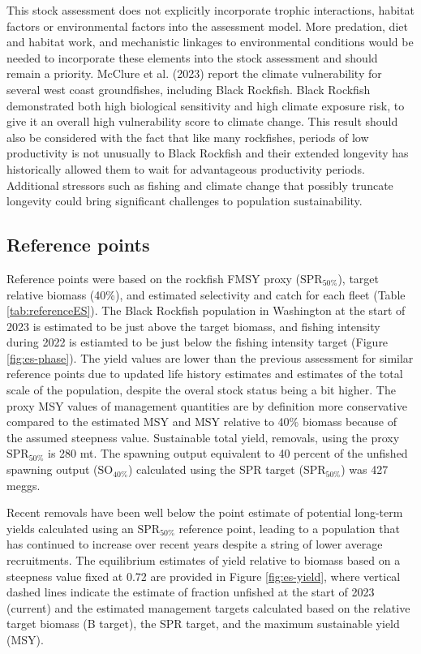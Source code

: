 \documentclass[11pt,
  english,
  letterpaper,
]{article}
\begin{document}
This stock assessment does not explicitly incorporate trophic interactions, habitat factors or environmental factors into the assessment model. More predation, diet and habitat work, and mechanistic linkages to environmental conditions would be needed to incorporate these elements into the stock assessment and should remain a priority. McClure et al. (2023) report the climate vulnerability for several west coast groundfishes, including Black Rockfish. Black Rockfish demonstrated both high biological sensitivity and high climate exposure risk, to give it an overall high vulnerability score to climate change. This result should also be considered with the fact that like many rockfishes, periods of low productivity is not unusually to Black Rockfish and their extended longevity has historically allowed them to wait for advantageous productivity periods. Additional stressors such as fishing and climate change that possibly truncate longevity could bring significant challenges to population sustainability.

\hypertarget{reference-points}{%
\subsection*{Reference points}\label{reference-points}}

Reference points were based on the rockfish FMSY proxy (\(\text{SPR}_{50\%}\)), target relative biomass (40\%), and estimated selectivity and catch for each fleet (Table \ref{tab:referenceES}). The Black Rockfish population in Washington at the start of 2023 is estimated to be just above the target biomass, and fishing intensity during 2022 is estiamted to be just below the fishing intensity target (Figure \ref{fig:es-phase}). The yield values are lower than the previous assessment for similar reference points due to updated life history estimates and estimates of the total scale of the population, despite the overal stock status being a bit higher. The proxy MSY values of management quantities are by definition more conservative compared to the estimated MSY and MSY relative to 40\% biomass because of the assumed steepness value. Sustainable total yield, removals, using the proxy \(\text{SPR}_{50\%}\) is 280 mt. The spawning output equivalent to 40 percent of the unfished spawning output (\(\text{SO}_{40\%}\)) calculated using the SPR target (\(\text{SPR}_{50\%}\)) was 427 meggs.

Recent removals have been well below the point estimate of potential long-term yields calculated using an \(\text{SPR}_{50\%}\) reference point, leading to a population that has continued to increase over recent years despite a string of lower average recruitments. The equilibrium estimates of yield relative to biomass based on a steepness value fixed at 0.72 are provided in Figure \ref{fig:es-yield}, where vertical dashed lines indicate the estimate of fraction unfished at the start of 2023 (current) and the estimated management targets calculated based on the relative target biomass (B target), the SPR target, and the maximum sustainable yield (MSY).
\end{document}
